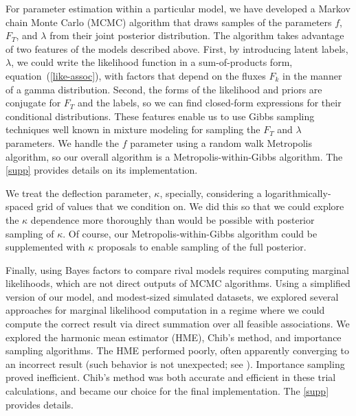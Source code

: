 For parameter estimation within a particular model, we have developed a
Markov chain Monte Carlo (MCMC) algorithm that draws samples of the
parameters $f$, $F_T$, and $\lambda$ from their joint posterior
distribution.  The algorithm takes advantage of two features of the models
described above.  First, by introducing latent labels, $\lambda$, we could
write the likelihood function in a sum-of-products form,
equation~(\ref{like-assoc}), with factors that depend on the fluxes
$F_k$ in the manner of a gamma distribution.  Second, the forms of the
likelihood and priors are conjugate for $F_T$ and the labels, so we can find
closed-form expressions for their conditional distributions.  These features
enable us to use Gibbs sampling techniques well known in mixture modeling
for sampling the $F_T$ and $\lambda$ parameters.  We handle the $f$
parameter using a random walk Metropolis algorithm, so our overall algorithm
is a Metropolis-within-Gibbs algorithm.  The \ref{supp} provides details on
its implementation.

We treat the deflection parameter, $\kappa$, specially, considering
a logarithmically-spaced grid of values that we condition on.  We
did this so that we could explore the $\kappa$ dependence more
thoroughly than would be possible with posterior sampling of $\kappa$.
Of course, our Metropolis-within-Gibbs algorithm could be supplemented
with $\kappa$ proposals to enable sampling of the full posterior.

Finally, using Bayes factors to compare rival models requires computing
marginal likelihoods, which are not direct outputs of MCMC algorithms.
Using a simplified version of our model, and modest-sized simulated
datasets, we explored several approaches for marginal likelihood computation
in a regime where we could compute the correct result via direct summation
over all feasible associations.  We explored the harmonic mean estimator
(HME), Chib's method, and importance sampling algorithms.  The HME
performed poorly, often apparently converging to an incorrect result (such
behavior is not unexpected; see \cite{WS12-HMBad}).  Importance sampling
proved inefficient.  Chib's method was both accurate and efficient in these
trial calculations, and became our choice for the final implementation.
The \ref{supp} provides details.
